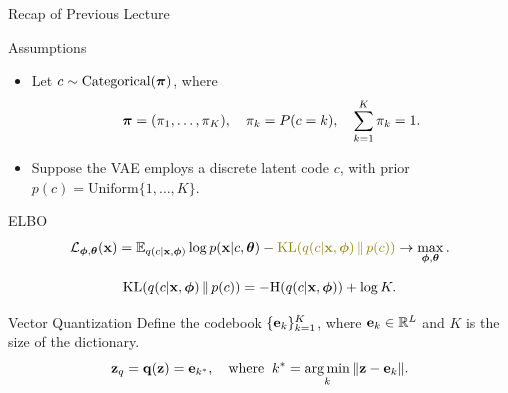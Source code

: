 \documentclass{beamer}
\begin{document}
\begin{frame}
	\titlepage
	\resetonslide
\end{frame}
\begin{frame}{Recap of Previous Lecture}
	\begin{block}{Assumptions}
		\begin{itemize}
			\item Let $c \sim \mathrm{Categorical}(\boldsymbol{\pi})$, where 
			\vspace{-0.6cm}
			\[
				\boldsymbol{\pi} = (\pi_1, \dots, \pi_K), \quad \pi_k = P(c = k), \quad \sum_{k=1}^K \pi_k = 1.
			\]
			\vspace{-0.7cm}
			\item Suppose the VAE employs a discrete latent code $c$, with prior $p(c) = \text{Uniform}\{1, \dots, K\}$.
		\end{itemize}
	\end{block}
	\begin{block}{ELBO}
		\vspace{-0.6cm}
		\[
			\cL_{\bphi, \btheta}(\bx)  = \bbE_{q(c | \bx, \bphi)} \log p(\bx | c, \btheta) - {\color{olive} \KL(q(c| \bx, \bphi) \,\|\, p(c))} \rightarrow \max_{\bphi, \btheta}.
		\]
	\end{block}
	\vspace{-1.0cm}
	\[
		\mathrm{KL}(q(c| \mathbf{x}, \boldsymbol{\phi}) \,\|\, p(c)) = - \mathrm{H}(q(c | \mathbf{x}, \boldsymbol{\phi})) + \log K. 
	\]		
	\vspace{-0.5cm}
	\begin{block}{Vector Quantization}
		Define the codebook $\{\mathbf{e}_k\}_{k=1}^K$, where $\mathbf{e}_k \in \mathbb{R}^L$ and $K$ is the size of the dictionary.
		\vspace{-0.3cm}
		\[
			\mathbf{z}_q = \mathbf{q} (\mathbf{z}) = \mathbf{e}_{k^*}, \quad \text{where}\;\; k^* = \operatorname*{arg\,min}_k \| \mathbf{z} - \mathbf{e}_k \|.
		\] 
		\vspace{-0.7cm}
	\end{block}
\end{frame}
\end{document}
